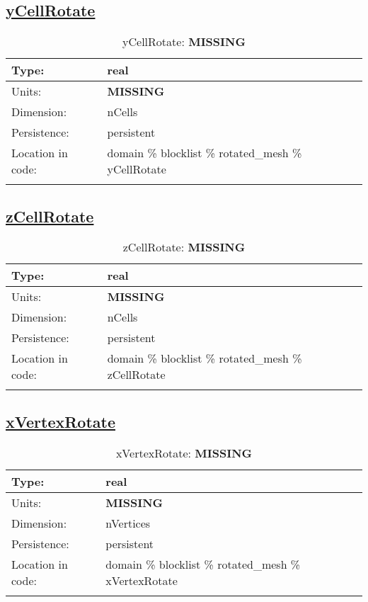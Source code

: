 \subsection[yCellRotate]{\hyperref[sec:var_tab_rotated_mesh]{yCellRotate}}
\label{subsec:var_sec_rotated_mesh_yCellRotate}
\begin{center}
\begin{longtable}{| p{2.0in} | p{4.0in} |}
        \hline 
        Type: & real \\
        \hline 
        Units: & {\bf \color{red} MISSING} \\
        \hline 
        Dimension: & nCells \\
        \hline 
        Persistence: & persistent \\
        \hline 
         Location in code: & domain \% blocklist \% rotated\_mesh \% yCellRotate \\
         \hline 
    \caption{yCellRotate: {\bf \color{red} MISSING}}
\end{longtable}
\end{center}
\subsection[zCellRotate]{\hyperref[sec:var_tab_rotated_mesh]{zCellRotate}}
\label{subsec:var_sec_rotated_mesh_zCellRotate}
\begin{center}
\begin{longtable}{| p{2.0in} | p{4.0in} |}
        \hline 
        Type: & real \\
        \hline 
        Units: & {\bf \color{red} MISSING} \\
        \hline 
        Dimension: & nCells \\
        \hline 
        Persistence: & persistent \\
        \hline 
         Location in code: & domain \% blocklist \% rotated\_mesh \% zCellRotate \\
         \hline 
    \caption{zCellRotate: {\bf \color{red} MISSING}}
\end{longtable}
\end{center}
\subsection[xVertexRotate]{\hyperref[sec:var_tab_rotated_mesh]{xVertexRotate}}
\label{subsec:var_sec_rotated_mesh_xVertexRotate}
\begin{center}
\begin{longtable}{| p{2.0in} | p{4.0in} |}
        \hline 
        Type: & real \\
        \hline 
        Units: & {\bf \color{red} MISSING} \\
        \hline 
        Dimension: & nVertices \\
        \hline 
        Persistence: & persistent \\
        \hline 
         Location in code: & domain \% blocklist \% rotated\_mesh \% xVertexRotate \\
         \hline 
    \caption{xVertexRotate: {\bf \color{red} MISSING}}
\end{longtable}
\end{center}
